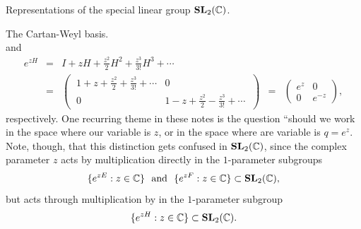 \documentclass[letterpaper,11pt, reqno]{amsart}
\newtheorem{monodromy theorem}{Monodromy Theorem}[subsection]
\newtheorem{wild conjecture}[theorem]{Wild Conjecture}
\newtheorem{research objectives}{Research objectives}[subsection]
\newtheorem{research question}[theorem]{Research questions}
\newtheorem{aside question}[theorem]{Aside question}
\newtheorem{audio example}[theorem]{\loudspeaker[3] Example}
\newtheorem{blank remark}[theorem]{}
\newtheorem{terminology and comment}[theorem]{Terminology and comment}
\newtheorem{purity hypothesis}[theorem]{Purity hypothesis}
\newtheorem{corollary of the purity hypothesis}[theorem]{Corollary of the purity hypothesis}
\newcommand{\CC} {{\mathbb C}}
\numberwithin{equation}{theorem}
\begin{document}
\begin{section}{Representations of the special linear group $\bold{SL}_{2}(\CC)$.}
\begin{subsection}{The Cartan-Weyl basis.}
$$	$$
and
	$$
	\begin{array}{rclcl}
	e^{zH}
	& \!\!=\!\! &
	I+zH+\frac{z^2}{2}H^2+\frac{z^3}{3!}H^3+\cdots
	\\[20pt]
	& \!\!=\!\! &
	\left(\ \!\begin{array}{cc} 1+z+\tfrac{z^2}{2}+\tfrac{z^3}{3!}+\cdots & 0 \\[7pt] 0 & 1-z+\tfrac{z^2}{2}-\tfrac{z^3}{3!}+\cdots\end{array}\!\ \right)
	& \!\!=\!\! &
	\left(\!\begin{array}{cc} e^z & 0 \\ 0 & e^{-z}\end{array}\!\right),
	\end{array}
	$$
respectively. One recurring theme in these notes is the question ``should we work in the space where our variable is $z$, or in the space where are variable is $q=e^{z}$. Note, though, that this distinction gets confused in $\bold{SL}_{2}(\CC)$, since the complex parameter $z$ acts by multiplication directly in the $1$-parameter subgroups $$\{e^{zE}:z\in\CC\}\ \ \text{and}\ \ \{e^{zF}:z\in\CC\}\subset\bold{SL}_{2}(\CC),$$ but acts through multiplication by in the $1$-parameter subgroup $$\{e^{zH}:z\in\CC\}\subset\bold{SL}_{2}(\CC).$$


\end{subsection}
\end{section}
\end{document}
